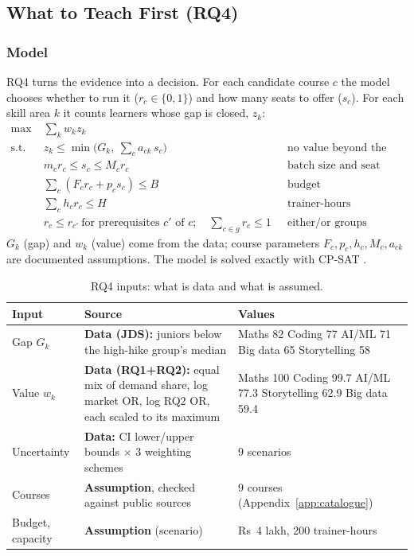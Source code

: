 \subsection{What to Teach First (RQ4)}\label{sec:rq4}

\subsubsection{Model}

RQ4 turns the evidence into a decision. For each candidate course $c$ the model chooses whether to
run it ($r_c \in \{0,1\}$) and how many seats to offer ($s_c$). For each skill area $k$ it counts
learners whose gap is closed, $z_k$:
\begin{align*}
\max \; & \textstyle\sum_k w_k z_k \\
\text{s.t. } & z_k \le \min\!\big(G_k,\ \textstyle\sum_c a_{ck}\, s_c\big) && \text{no value beyond the gap}\\
& m_c r_c \le s_c \le M_c r_c && \text{batch size and seat limits}\\
& \textstyle\sum_c (F_c r_c + p_c s_c) \le B && \text{budget}\\
& \textstyle\sum_c h_c r_c \le H && \text{trainer-hours}\\
& r_c \le r_{c'} \ \text{for prerequisites } c' \text{ of } c; \quad \textstyle\sum_{c\in g} r_c \le 1 && \text{either/or groups}
\end{align*}
$G_k$ (gap) and $w_k$ (value) come from the data; course parameters $F_c, p_c, h_c, M_c, a_{ck}$ are
documented assumptions. The model is solved exactly with CP-SAT \citep{cpsat}.

\begin{table}[H]\centering\small
\caption{RQ4 inputs: what is data and what is assumed.}\label{tab:rq4in}
\begin{tabularx}{\linewidth}{@{}L{3.1cm}L{4.6cm}Y@{}}
\toprule
Input & Source & Values \\
\midrule
Gap $G_k$ & \textbf{Data (JDS):} juniors below the high-hike group's median & Maths 82 \textbullet{} Coding 77 \textbullet{} AI/ML 71 \textbullet{} Big data 65 \textbullet{} Storytelling 58\\
Value $w_k$ & \textbf{Data (RQ1+RQ2):} equal mix of demand share, log market OR, log RQ2 OR, each scaled to its maximum & Maths 100 \textbullet{} Coding 99.7 \textbullet{} AI/ML 77.3 \textbullet{} Storytelling 62.9 \textbullet{} Big data 59.4\\
Uncertainty & \textbf{Data:} CI lower/upper bounds $\times$ 3 weighting schemes & 9 scenarios\\
Courses & \textbf{Assumption}, checked against public sources & 9 courses (Appendix~\ref{app:catalogue})\\
Budget, capacity & \textbf{Assumption} (scenario) & Rs~4 lakh, 200 trainer-hours\\
\bottomrule
\end{tabularx}
\end{table}

